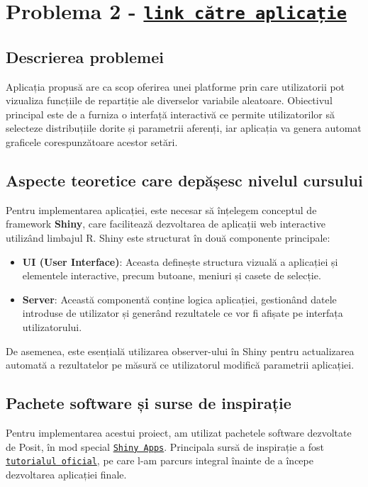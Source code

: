 \documentclass{article}
\begin{document}
\newpage

\section{Problema 2 - \href{https://broski-corp.shinyapps.io/Exercitiul-2-PS/}{\texttt{link către aplicație}}}
\vspace{2em}

\subsection*{Descrierea problemei}
\vspace{0.4em}
Aplicația propusă are ca scop oferirea unei platforme prin care utilizatorii pot vizualiza funcțiile de repartiție ale diverselor variabile aleatoare. Obiectivul principal este de a furniza o interfață interactivă ce permite utilizatorilor să selecteze distribuțiile dorite și parametrii aferenți, iar aplicația va genera automat graficele corespunzătoare acestor setări.

\subsection*{Aspecte teoretice care depășesc nivelul cursului}
\vspace{0.4em}
Pentru implementarea aplicației, este necesar să înțelegem conceptul de framework \textbf{Shiny}, care facilitează dezvoltarea de aplicații web interactive utilizând limbajul R. Shiny este structurat în două componente principale:
\begin{itemize}
    \item \textbf{UI (User Interface)}: Aceasta definește structura vizuală a aplicației și elementele interactive, precum butoane, meniuri și casete de selecție.
    \item \textbf{Server}: Această componentă conține logica aplicației, gestionând datele introduse de utilizator și generând rezultatele ce vor fi afișate pe interfața utilizatorului.
\end{itemize}
De asemenea, este esențială utilizarea observer-ului în Shiny pentru actualizarea automată a rezultatelor pe măsură ce utilizatorul modifică parametrii aplicației.

\subsection*{Pachete software și surse de inspirație}
\vspace{0.4em}
Pentru implementarea acestui proiect, am utilizat pachetele software dezvoltate de Posit, în mod special \href{https://shiny.posit.co/}{\texttt{Shiny Apps}}. Principala sursă de inspirație a fost \href{https://shiny.posit.co/r/getstarted/shiny-basics/lesson1/}{\texttt{tutorialul oficial}}, pe care l-am parcurs integral înainte de a începe dezvoltarea aplicației finale.
\end{document}
